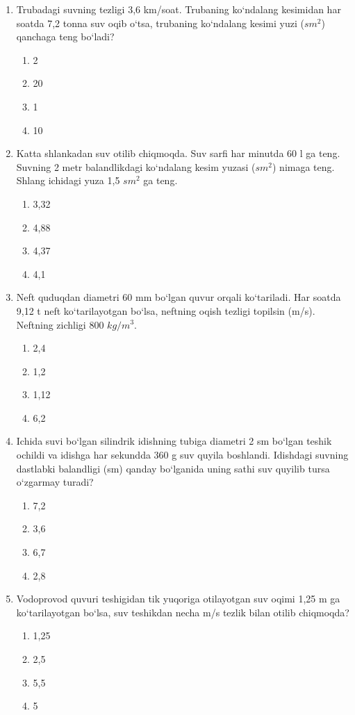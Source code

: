 \begin{enumerate}
\item Trubadagi suvning tezligi 3,6 km/soat. Trubaning ko‘ndalang kesimidan har soatda 7,2 tonna suv oqib o‘tsa, trubaning ko‘ndalang kesimi yuzi ($sm^2$) qanchaga teng bo‘ladi?
\begin{enumerate}[label=\Alph*)]
\item 2
\item 20
\item 1
\item 10
\end{enumerate}

\item Katta shlankadan suv otilib chiqmoqda. Suv sarfi har minutda 60 l ga teng. Suvning 2 metr balandlikdagi ko‘ndalang kesim yuzasi ($sm^2$) nimaga teng. Shlang ichidagi yuza 1,5 $sm^2$ ga teng.
\begin{enumerate}[label=\Alph*)]
\item 3,32
\item 4,88
\item 4,37
\item 4,1
\end{enumerate}

\item Neft quduqdan diametri 60 mm bo‘lgan quvur orqali ko‘tariladi. Har soatda 9,12 t neft ko‘tarilayotgan bo‘lsa, neftning oqish tezligi topilsin (m/s). Neftning zichligi 800 $kg/m^3$.
\begin{enumerate}[label=\Alph*)]
\item 2,4
\item 1,2
\item 1,12
\item 6,2
\end{enumerate}

\item Ichida suvi bo‘lgan silindrik idishning tubiga diametri 2 sm bo‘lgan teshik ochildi va idishga har sekundda 360 g suv quyila boshlandi. Idishdagi suvning dastlabki balandligi (sm) qanday bo‘lganida uning sathi suv quyilib tursa o‘zgarmay turadi?
\begin{enumerate}[label=\Alph*)]
\item 7,2
\item 3,6
\item 6,7
\item 2,8
\end{enumerate}

\item Vodoprovod quvuri teshigidan tik yuqoriga otilayotgan suv oqimi 1,25 m ga ko‘tarilayotgan bo‘lsa, suv teshikdan necha m/s tezlik bilan otilib chiqmoqda?
\begin{enumerate}[label=\Alph*)]
\item 1,25
\item 2,5
\item 5,5
\item 5
\end{enumerate}


\end{enumerate}
